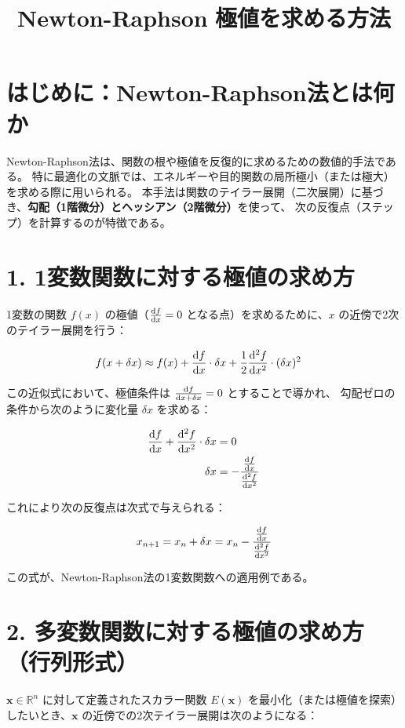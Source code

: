 \documentclass{article}
\title{Newton-Raphson\,\textendash\,\textbf{極値を求める方法}}
\date{}
\begin{document}
\maketitle

\section*{はじめに：Newton-Raphson法とは何か}

Newton-Raphson法は、関数の根や極値を反復的に求めるための数値的手法である。
特に最適化の文脈では、エネルギーや目的関数の局所極小（または極大）を求める際に用いられる。
本手法は関数のテイラー展開（二次展開）に基づき、\textbf{勾配（1階微分）とヘッシアン（2階微分）}を使って、
次の反復点（ステップ）を計算するのが特徴である。

\section*{1. 1変数関数に対する極値の求め方}

1変数の関数 $f(x)$ の極値（$\dv{f}{x} = 0$ となる点）を求めるために、$x$ の近傍で2次のテイラー展開を行う：

\begin{align*}
  f(x + \delta x) &\approx f(x) + \dv{f}{x} \cdot \delta x + \frac{1}{2} \dv[2]{f}{x} \cdot (\delta x)^2
\end{align*}

この近似式において、極値条件は $\dv{f}{x + \delta x} = 0$ とすることで導かれ、
勾配ゼロの条件から次のように変化量 $\delta x$ を求める：

\begin{align*}
  \dv{f}{x} + \dv[2]{f}{x} \cdot \delta x &= 0 \\
  \delta x &= - \frac{\dv{f}{x}}{\dv[2]{f}{x}}
\end{align*}

これにより次の反復点は次式で与えられる：

\begin{align*}
  x_{n+1} = x_n + \delta x = x_n - \frac{\dv{f}{x}}{\dv[2]{f}{x}}
\end{align*}

この式が、Newton-Raphson法の1変数関数への適用例である。

\section*{2. 多変数関数に対する極値の求め方（行列形式）}

$\bm{x} \in \mathbb{R}^n$ に対して定義されたスカラー関数 $E(\bm{x})$ を最小化（または極値を探索）したいとき、$\bm{x}$ の近傍での2次テイラー展開は次のようになる：
\end{document}
